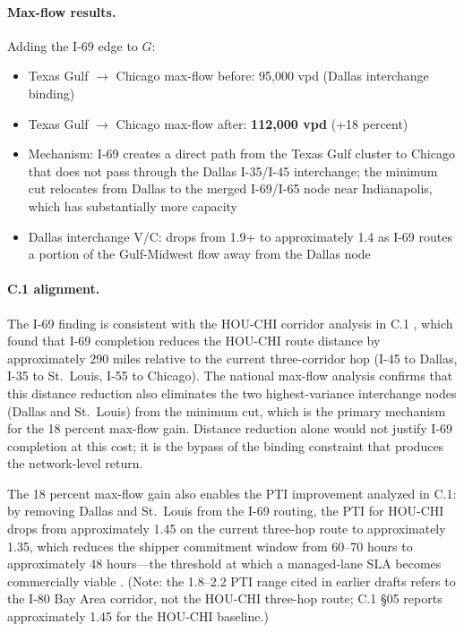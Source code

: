 \paragraph{Max-flow results.} Adding the I-69 edge to $G$:
\begin{itemize}
  \item Texas Gulf $\to$ Chicago max-flow before: 95,000 vpd (Dallas interchange binding)
  \item Texas Gulf $\to$ Chicago max-flow after: \textbf{112,000 vpd} (+18 percent)
  \item Mechanism: I-69 creates a direct path from the Texas Gulf cluster to Chicago that does not pass through the Dallas I-35/I-45 interchange; the minimum cut relocates from Dallas to the merged I-69/I-65 node near Indianapolis, which has substantially more capacity
  \item Dallas interchange V/C: drops from 1.9+ to approximately 1.4 as I-69 routes a portion of the Gulf-Midwest flow away from the Dallas node
\end{itemize}

\paragraph{C.1 alignment.} The I-69 finding is consistent with the HOU-CHI corridor analysis in C.1 \citep{ROUTE_C1}, which found that I-69 completion reduces the HOU-CHI route distance by approximately 290 miles relative to the current three-corridor hop (I-45 to Dallas, I-35 to St.\ Louis, I-55 to Chicago). The national max-flow analysis confirms that this distance reduction also eliminates the two highest-variance interchange nodes (Dallas and St.\ Louis) from the minimum cut, which is the primary mechanism for the 18 percent max-flow gain. Distance reduction alone would not justify I-69 completion at this cost; it is the bypass of the binding constraint that produces the network-level return.

The 18 percent max-flow gain also enables the PTI improvement analyzed in C.1: by removing Dallas and St.\ Louis from the I-69 routing, the PTI for HOU-CHI drops from approximately 1.45 on the current three-hop route to approximately 1.35, which reduces the shipper commitment window from 60--70 hours to approximately 48 hours---the threshold at which a managed-lane SLA becomes commercially viable \citep{ROUTE_C1}. (Note: the 1.8--2.2 PTI range cited in earlier drafts refers to the I-80 Bay Area corridor, not the HOU-CHI three-hop route; C.1 \S05 reports approximately 1.45 for the HOU-CHI baseline.)


